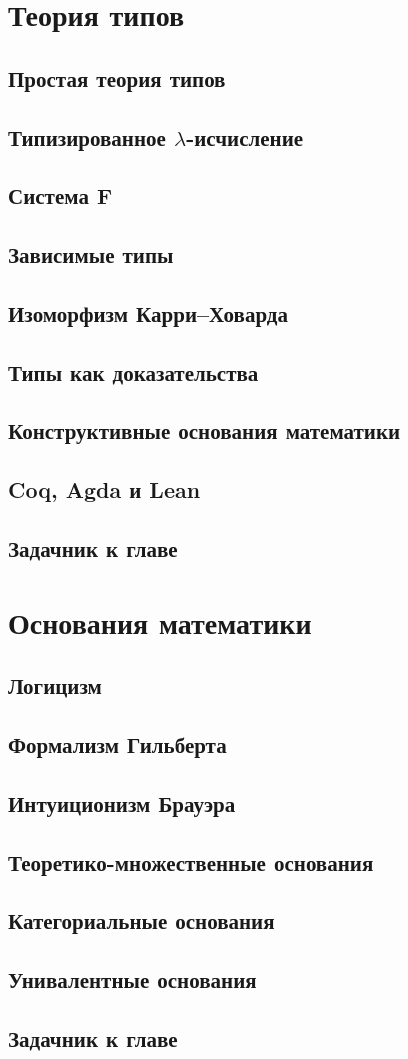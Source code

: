 \documentclass[12pt,a4paper,oneside,openany]{book}
\theoremstyle{definition}
\theoremstyle{plain}
\theoremstyle{remark}
\begin{document}
\chapter{Теория типов}

\section{Простая теория типов}
\section{Типизированное \texorpdfstring{$\lambda$}{lambda}-исчисление}
\section{Система F}
\section{Зависимые типы}
\section{Изоморфизм Карри--Ховарда}
\section{Типы как доказательства}
\section{Конструктивные основания математики}
\section{Coq, Agda и Lean}

\section{Задачник к главе}

\chapter{Основания математики}

\section{Логицизм}
\section{Формализм Гильберта}
\section{Интуиционизм Брауэра}
\section{Теоретико-множественные основания}
\section{Категориальные основания}
\section{Унивалентные основания}

\section{Задачник к главе}
\end{document}
